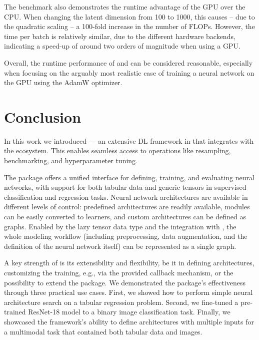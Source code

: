 \documentclass[article]{jss}
\theoremstyle{definition}
\begin{document}
The benchmark also demonstrates the runtime advantage of the GPU over the CPU.
When changing the latent dimension from 100 to 1000, this causes -- due to the quadratic scaling -- a 100-fold increase in the number of FLOPs.
However, the time per batch is relatively similar, due to the different hardware backends, indicating a speed-up of around two orders of magnitude when using a GPU.

Overall, the runtime performance of \mlrttorch{} and \torch{} can be considered reasonable, especially when focusing on the arguably most realistic case of training a neural network on the GPU using the AdamW optimizer.

\section{Conclusion}\label{sec:conclusion}

In this work we introduced  --- an extensive DL framework in \rlang{} that integrates with the \mlrt{} ecosystem.
This enables seamless access to operations like resampling, benchmarking, and hyperparameter tuning.

The package offers a unified interface for defining, training, and evaluating neural networks, with support for both tabular data and generic tensors in supervised classification and regression tasks.
Neural network architectures are available in different levels of control: predefined architectures are readily available, \torch{} modules can be easily converted to \mlrttorch{} learners, and custom architectures can be defined as graphs.
Enabled by the lazy tensor data type and the integration with \mlrtpipelines{}, the whole modeling workflow (including preprocessing, data augmentation, and the definition of the neural network itself) can be represented as a single graph.

A key strength of  is its extensibility and flexibility, be it in defining architectures, customizing the training, e.g., via the provided callback mechanism, or the possibility to extend the package.
We demonstrated the package's effectiveness through three practical use cases. First, we showed how to perform simple neural architecture search on a tabular regression problem.
Second, we fine-tuned a pre-trained ResNet-18 model to a binary image classification task.
Finally, we showcased the framework's ability to define architectures with multiple inputs for a multimodal task that contained both tabular data and images.
\end{document}
